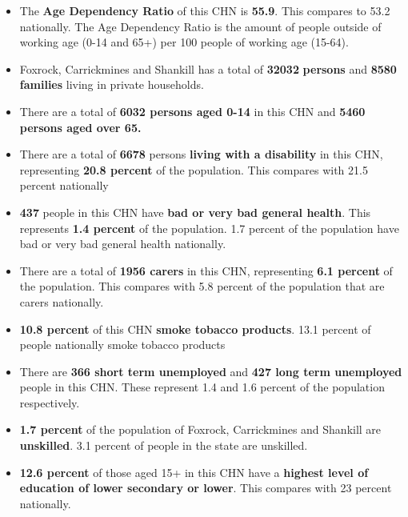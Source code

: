 \documentclass{article}
\begin{document}
\begin{itemize}

\item The \textbf{Age Dependency Ratio} of this CHN is  \textbf{55.9}. This compares to 53.2 nationally. The Age Dependency Ratio is the amount of people outside of working age (0-14 and 65+) per 100 people of working age (15-64). 

\item Foxrock, Carrickmines and Shankill has a total of \textbf{\num{32032}} \textbf{persons} and  \textbf{\num{8580}} \textbf{families} living in private households.

\item There are a total of \textbf{\num{6032} persons aged 0-14} in this CHN and \textbf{\num{5460} persons aged over 65.} 

\item There are a total of \textbf{\num{6678}} persons \textbf{living with a disability} in this CHN, representing \textbf{20.8 percent} of the population. This compares with  21.5 percent nationally

\item \textbf{\num{437}} people in this CHN have \textbf{bad or very bad general health}. This represents \textbf{1.4 percent} of the population. 1.7 percent of the population have bad or very bad general health nationally. 

\item There are a total of \textbf{\num{1956} carers} in this CHN, representing \textbf{6.1 percent} of the population. This compares with 5.8 percent of the population that are carers nationally. 

\item \textbf{10.8 percent} of this CHN \textbf{smoke tobacco products}. 13.1 percent of people nationally smoke tobacco products

\item There are \textbf{\num{366} short term unemployed} and \textbf{\num{427} long term unemployed} people in this CHN. These represent 1.4 and 1.6 percent of the population respectively.

\item  \textbf{1.7 percent} of the population of Foxrock, Carrickmines and Shankill are \textbf{unskilled}. 3.1 percent of people in the state are unskilled.

\item \textbf{12.6 percent} of those aged 15+ in this CHN have a \textbf{highest level of education of lower secondary or lower}. This compares with 23 percent nationally. 


\end{itemize}
\end{document}
